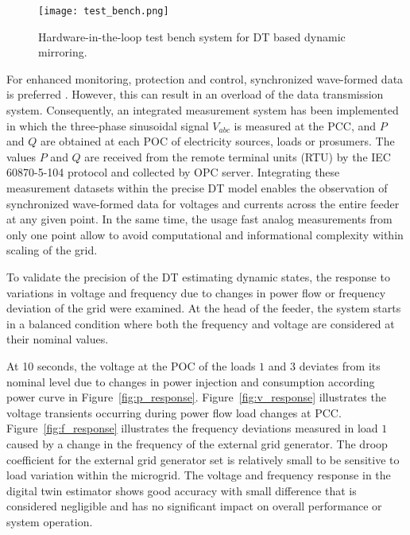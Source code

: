 \begin{figure}[htbp]
    \centering
    \texttt{[image: test\_bench.png]}
    \caption{Hardware-in-the-loop test bench system for DT based dynamic mirroring.}
    \label{fig:rt_test_bench}
\end{figure}

For enhanced monitoring, protection and control, synchronized wave-formed data is preferred \autocite{Xu_Huang_Xie_Li_2022}. However, this can result in an overload of the data transmission system. Consequently, an integrated measurement system has been implemented in which the three-phase sinusoidal signal $V_{abc}$ is measured at the PCC, and $P$ and $Q$ are obtained at each POC of electricity sources, loads or prosumers. The values $P$ and $Q$ are received from the remote terminal units (RTU) by the IEC 60870-5-104 protocol and collected by OPC server. Integrating these measurement datasets within the precise DT model enables the observation of synchronized wave-formed data for voltages and currents across the entire feeder at any given point. In the same time, the usage fast analog measurements from only one point allow to avoid computational and informational complexity within scaling of the grid.

To validate the precision of the DT estimating dynamic states, the response to variations in voltage and frequency due to changes in power flow or frequency deviation of the grid were examined. At the head of the feeder, the system starts in a balanced condition where both the frequency and voltage are considered at their nominal values. 

At 10 seconds, the voltage at the POC of the loads $1$ and $3$ deviates from its nominal level due to changes in power injection and consumption according power curve in Figure~\cref{fig:p_response}. Figure~\cref{fig:v_response} illustrates the voltage transients occurring during power flow load changes at PCC. Figure~\cref{fig:f_response} illustrates the frequency deviations measured in load $1$ caused by a change in the frequency of the external grid generator. The droop coefficient for the external grid generator set is relatively small to be sensitive to load variation within the microgrid. The voltage and frequency response in the digital twin estimator shows good accuracy with small difference that is considered negligible and has no significant impact on overall performance or system operation.

